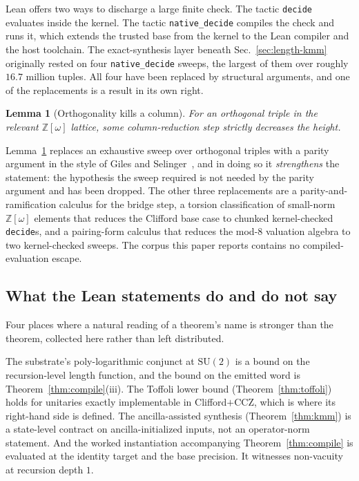 \documentclass[aps,pra,reprint,nofootinbib,superscriptaddress]{revtex4-2}
\newcommand{\lean}[1]{\texttt{#1}}
\newcommand{\su}[1]{\mathrm{SU}(#1)}
\theoremstyle{plain}
\newtheorem{lemma}[theorem]{Lemma}
\theoremstyle{definition}
\begin{document}
Lean offers two ways to discharge a large finite check. The tactic
\lean{decide} evaluates inside the kernel. The tactic \lean{native\_decide}
compiles the check and runs it, which extends the trusted base from the kernel
to the Lean compiler and the host toolchain. The exact-synthesis layer beneath
Sec.~\ref{sec:length-kmm} originally rested on four \lean{native\_decide}
sweeps, the largest of them over roughly $16.7$ million tuples. All four have
been replaced by structural arguments, and one of the replacements is a result
in its own right.

\begin{lemma}[Orthogonality kills a column]
\label{lem:somekills}
For an orthogonal triple in the relevant $\mathbb Z[\omega]$ lattice, some
column-reduction step strictly decreases the height.
\end{lemma}

Lemma~\ref{lem:somekills} replaces an exhaustive sweep over orthogonal triples
with a parity argument in the style of Giles and
Selinger~\cite{GilesSelinger2013}, and in doing so it \emph{strengthens} the
statement: the hypothesis the sweep required is not needed by the parity
argument and has been dropped. The other three replacements are a
parity-and-ramification calculus for the bridge step, a torsion classification
of small-norm $\mathbb Z[\omega]$ elements that reduces the Clifford base case
to chunked kernel-checked \lean{decide}s, and a pairing-form calculus that
reduces the mod-$8$ valuation algebra to two kernel-checked sweeps. The corpus
this paper reports contains no compiled-evaluation escape.

\subsection{What the Lean statements do and do not say}

Four places where a natural reading of a theorem's name is stronger than the
theorem, collected here rather than left distributed.

The substrate's poly-logarithmic conjunct at $\su 2$ is a bound on the
recursion-level length function, and the bound on the emitted word is
Theorem~\ref{thm:compile}(iii). The Toffoli lower bound
(Theorem~\ref{thm:toffoli}) holds for unitaries exactly implementable in
Clifford$+$CCZ, which is where its right-hand side is defined. The
ancilla-assisted synthesis (Theorem~\ref{thm:kmm}) is a state-level contract on
ancilla-initialized inputs, not an operator-norm statement. And the worked
instantiation accompanying Theorem~\ref{thm:compile} is evaluated at the
identity target and the base precision. It witnesses non-vacuity at
recursion depth $1$.
\end{document}
